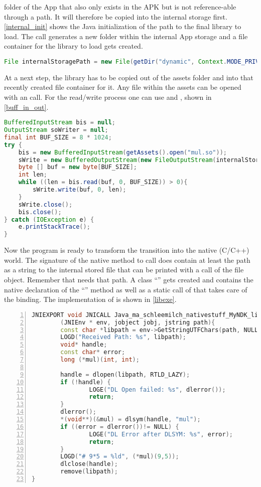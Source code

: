  folder of the App that also only exists in the APK but is not
reference-able through a path. It will therefore be copied into the internal storage first. \autoref{internal_init} shows the Java initialization of the path to the final library to load. The  call generates a new folder within the internal App storage and a file container for the library to load gets created.
\begin{lstlisting}[language=Java, caption=Internal Storage Initialization, label=internal_init]
File internalStoragePath = new File(getDir("dynamic", Context.MODE_PRIVATE), "mul.so");
\end{lstlisting}
At a next step, the library has to be copied out of the assets folder and into that
recently created file container for it. Any file within the assets can be opened with an
 call. For the read/write process one can use
 and , shown in
\autoref{buff_in_out}.
\begin{lstlisting}[language=Java, caption=Buffered Input/Output, label=buff_in_out]
BufferedInputStream bis = null;
OutputStream soWriter = null;
final int BUF_SIZE = 8 * 1024;
try {
    bis = new BufferedInputStream(getAssets().open("mul.so"));
    sWrite = new BufferedOutputStream(new FileOutputStream(internalStoragePath));
    byte [] buf = new byte[BUF_SIZE];
    int len;
    while ((len = bis.read(buf, 0, BUF_SIZE)) > 0){
        sWrite.write(buf, 0, len);
    }
    sWrite.close();
    bis.close();
} catch (IOException e) {
    e.printStackTrace();
}
\end{lstlisting}
Now the program is ready to transform the transition into the native (C/C++) world.
The signature of the native method to call does contain at least the path as a string to
the internal stored file that can be printed with a  call of the
 file object. Remember that  needs that path.
A class ``'' gets created and contains the native declaration of the
``'' method as well as a static call of
 that takes care of the binding.
The implementation of  is shown in \autoref{libexe}.
\begin{lstlisting}[language=C++, caption=Native libExe(), label=libexe, numbers=left]
JNIEXPORT void JNICALL Java_ma_schleemilch_nativestuff_MyNDK_libExe
        (JNIEnv * env, jobject jobj, jstring path){
        const char *libpath = env->GetStringUTFChars(path, NULL);
        LOGD("Received Path: %s", libpath);
        void* handle;
        const char* error;
        long (*mul)(int, int);

        handle = dlopen(libpath, RTLD_LAZY);
        if (!handle) {
                LOGE("DL Open failed: %s", dlerror());
                return;
        }
        dlerror();
        *(void**)(&mul) = dlsym(handle, "mul");
        if ((error = dlerror())!= NULL) {
                LOGE("DL Error after DLSYM: %s", error);
                return;
        }
        LOGD("# 9*5 = %ld", (*mul)(9,5));
        dlclose(handle);
        remove(libpath);
}
\end{lstlisting}
